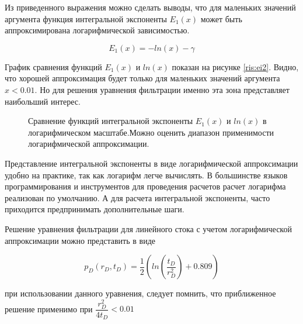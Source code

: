 Из приведенного выражения можно сделать выводы, что для маленьких значений аргумента  функция интегральной экспоненты $E_1(x)$ может быть аппроксимирована логарифмической зависимостью. 

$$E_1(x) = -ln(x) - \gamma $$

График сравнения функций $E_1(x)$ и $ln(x)$ показан на рисунке \ref{ris:ei2}. Видно, что хорошей аппроксимация будет только для маленьких значений аргумента $x < 0.01$. Но для решения уравнения фильтрации именно эта зона представляет наибольший интерес.

\begin{figure}[h!]
	\begin{center}
		\caption{Сравнение функций интегральной экспоненты $E_1(x)$ и $ln(x)$ в логарифмическом масштабе.Можно оценить диапазон применимости логарифмической аппроксимации.}
		\label{ris:ei3}
	\end{center}
\end{figure}

Представление интегральной экспоненты в виде логарифмической аппроксимации удобно на практике, так как логарифм легче вычислять. В большинстве языков программирования и инструментов для проведения расчетов расчет логарифма реализован по умолчанию. А для расчета интегральной экспоненты, часто приходится предпринимать дополнительные шаги.

Решение уравнения фильтрации для линейного стока с учетом логарифмической аппроксимации можно представить в виде 

\begin{equation}
p_D(r_D,t_D) = \frac{1}{2} \left( ln \left( \dfrac{ t_D }{r_D^2}  \right) +0.809 \right) 
\end{equation}


при использовании данного уравнения, следует помнить, что приближенное решение применимо при $\dfrac{r_D^2}{4t_D} < 0.01$


